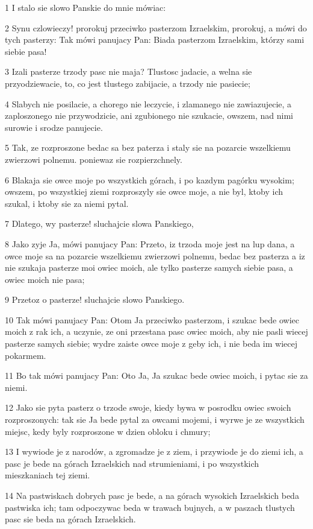 \par 1 I stalo sie slowo Panskie do mnie mówiac:
\par 2 Synu czlowieczy! prorokuj przeciwko pasterzom Izraelskim, prorokuj, a mówi do tych pasterzy: Tak mówi panujacy Pan: Biada pasterzom Izraelskim, którzy sami siebie pasa!
\par 3 Izali pasterze trzody pasc nie maja? Tlustosc jadacie, a welna sie przyodziewacie, to, co jest tlustego zabijacie, a trzody nie pasiecie;
\par 4 Slabych nie posilacie, a chorego nie leczycie, i zlamanego nie zawiazujecie, a zaploszonego nie przywodzicie, ani zgubionego nie szukacie, owszem, nad nimi surowie i srodze panujecie.
\par 5 Tak, ze rozproszone bedac sa bez paterza i staly sie na pozarcie wszelkiemu zwierzowi polnemu. poniewaz sie rozpierzchnely.
\par 6 Blakaja sie owce moje po wszystkich górach, i po kazdym pagórku wysokim; owszem, po wszystkiej ziemi rozproszyly sie owce moje, a nie byl, ktoby ich szukal, i ktoby sie za niemi pytal.
\par 7 Dlatego, wy pasterze! sluchajcie slowa Panskiego,
\par 8 Jako zyje Ja, mówi panujacy Pan: Przeto, iz trzoda moje jest na lup dana, a owce moje sa na pozarcie wszelkiemu zwierzowi polnemu, bedac bez pasterza a iz nie szukaja pasterze moi owiec moich, ale tylko pasterze samych siebie pasa, a owiec moich nie pasa;
\par 9 Przetoz o pasterze! sluchajcie slowo Panskiego.
\par 10 Tak mówi panujacy Pan: Otom Ja przeciwko pasterzom, i szukac bede owiec moich z rak ich, a uczynie, ze oni przestana pasc owiec moich, aby nie pasli wiecej pasterze samych siebie; wydre zaiste owce moje z geby ich, i nie beda im wiecej pokarmem.
\par 11 Bo tak mówi panujacy Pan: Oto Ja, Ja szukac bede owiec moich, i pytac sie za niemi.
\par 12 Jako sie pyta pasterz o trzode swoje, kiedy bywa w posrodku owiec swoich rozproszonych: tak sie Ja bede pytal za owcami mojemi, i wyrwe je ze wszystkich miejsc, kedy byly rozproszone w dzien obloku i chmury;
\par 13 I wywiode je z narodów, a zgromadze je z ziem, i przywiode je do ziemi ich, a pasc je bede na górach Izraelskich nad strumieniami, i po wszystkich mieszkaniach tej ziemi.
\par 14 Na pastwiskach dobrych pasc je bede, a na górach wysokich Izraelskich beda pastwiska ich; tam odpoczywac beda w trawach bujnych, a w paszach tlustych pasc sie beda na górach Izraelskich.
